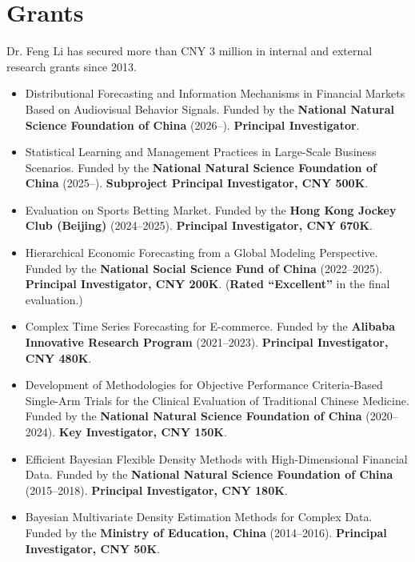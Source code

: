 \documentclass[twoside,a4paper]{article}
\begin{document}
\section{Grants}

Dr. Feng Li has secured more than CNY 3 million in internal and external research grants since 2013.

\begin{itemize}

\item Distributional Forecasting and Information Mechanisms in Financial Markets Based on Audiovisual Behavior Signals. Funded by the \textbf{National Natural Science Foundation of China} (2026--). \textbf{Principal Investigator}.

\item Statistical Learning and Management Practices in Large-Scale Business Scenarios. Funded by the \textbf{National Natural Science Foundation of China} (2025--). \textbf{Subproject Principal Investigator, CNY 500K}.

\item Evaluation on Sports Betting Market. Funded by the \textbf{Hong Kong Jockey Club (Beijing)} (2024--2025). \textbf{Principal Investigator, CNY 670K}.

\item Hierarchical Economic Forecasting from a Global Modeling Perspective. Funded by the \textbf{National Social Science Fund of China} (2022--2025). \textbf{Principal Investigator, CNY 200K}. (\textbf{Rated ``Excellent''} in the final evaluation.)

\item Complex Time Series Forecasting for E-commerce. Funded by the \textbf{Alibaba Innovative Research Program} (2021--2023). \textbf{Principal Investigator, CNY 480K}.

\item Development of Methodologies for Objective Performance Criteria-Based Single-Arm Trials for the Clinical Evaluation of Traditional Chinese Medicine. Funded by the \textbf{National Natural Science Foundation of China} (2020--2024). \textbf{Key Investigator, CNY 150K}.

\item Efficient Bayesian Flexible Density Methods with High-Dimensional Financial Data. Funded by the \textbf{National Natural Science Foundation of China} (2015--2018). \textbf{Principal Investigator, CNY 180K}.

\item Bayesian Multivariate Density Estimation Methods for Complex Data. Funded by the \textbf{Ministry of Education, China} (2014--2016). \textbf{Principal Investigator, CNY 50K}.

\end{itemize}
\end{document}
